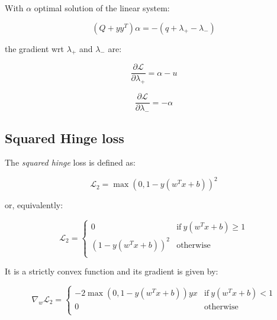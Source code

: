 With $\alpha$ optimal solution of the linear system:

\begin{equation} \label{eq:l1_svc_bcqp_lagrangian_sol}
    (Q + yy^T) \alpha = - (q + \lambda_+ - \lambda_-)
\end{equation}

the gradient wrt $\lambda_+$ and $\lambda_-$ are:

\begin{equation} \label{eq:l1_svc_bcqp_lagrangian_der_lp}
	\frac{\partial \mathcal{L}}{\partial \lambda_+}=\alpha - u
\end{equation}

\begin{equation} \label{eq:l1_svc_bcqp_lagrangian_der_lm}
    \frac{\partial \mathcal{L}}{\partial \lambda_-}=-\alpha
\end{equation}

\pagebreak

\subsection{Squared Hinge loss}

The \emph{squared hinge} loss is defined as:

\begin{equation} \label{eq:squared_hinge_loss2}
	\mathcal{L}_2 = \max(0, 1 - y (w^T x + b))^2
\end{equation}

or, equivalently:

\begin{equation} \label{eq:squared_hinge_loss1}
	\mathcal{L}_2 = 
	\begin{cases}
		0 & \text{if} \ y (w^T x + b) \geq 1 \\
		(1 - y (w^T x + b))^2 & \text{otherwise} \\
	\end{cases}
\end{equation}

It is a strictly convex function and its gradient is given by:

\begin{equation} \label{eq:squared_hinge_loss_der}
    \nabla_w \mathcal{L}_2=
        \begin{cases}
            - 2 \max(0, 1 - y (w^T x + b)) y x & \text{if} \ y (w^T x + b) < 1 \\
            0 & \text{otherwise} \\ 
        \end{cases}
\end{equation}

